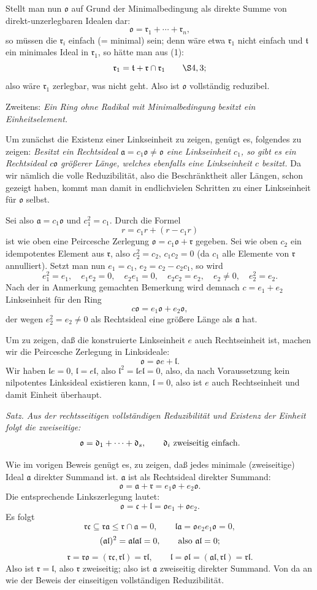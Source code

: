 \documentclass[11pt]{article}
\providecommand{\mo}{\mathfrak{o}}
\providecommand{\ma}{\mathfrak{a}}
\providecommand{\mc}{\mathfrak{c}}
\providecommand{\md}{\mathfrak{d}}
\providecommand{\ml}{\mathfrak{l}}
\providecommand{\mr}{\mathfrak{r}}
\providecommand{\mt}{\mathfrak{t}}
\begin{document}
Stellt man nun $\mo$ auf Grund der Minimalbedingung als direkte Summe von direkt-unzerlegbaren Idealen dar:
\[
        \mo=\mr_1+\cdots+\mr_n,
\]
so müssen die $\mr_i$ einfach (= minimal) sein; denn wäre etwa $\mr_1$ nicht einfach und $\mt$ ein minimales Ideal in $\mr_1$, so hätte man aus (1):
\[
        \mr_1=\mt+\mr\cap\mr_1 \qquad \hbox{\(\S 4,3\)};
\]
also wäre $\mr_1$ zerlegbar, was nicht geht. Also ist $\mo$ vollständig reduzibel.

Zweitens: \emph{Ein Ring ohne Radikal mit Minimalbedingung besitzt ein Einheitselement.}

Um zunächst die Existenz einer Linkseinheit zu zeigen, genügt es, folgendes zu zeigen: \emph{Besitzt ein Rechtsideal $\ma=c_1\mo\ne\mo$ eine Linkseinheit $c_1$, so gibt es ein Rechtsideal $c\mo$ größerer Länge, welches ebenfalls eine Linkseinheit $c$ besitzt.} Da wir nämlich die volle Reduzibilität, also die Beschränktheit aller Längen, schon gezeigt haben, kommt man damit in endlichvielen Schritten zu einer Linkseinheit für $\mo$ selbst.

Sei also $\ma=c_1\mo$ und $c_1^2=c_1$. Durch die Formel
\[
        r=c_1r+(r-c_1r)
\]
ist wie oben eine Peircesche Zerlegung $\mo=c_1\mo+\mr$ gegeben. Sei wie oben $c_2$ ein idempotentes Element aus $\mr$, also $c_2^2=c_2$, $c_1c_2=0$ (da $c_1$ alle Elemente von $\mr$ annulliert). Setzt man nun $e_1=c_1$, $e_2=c_2-c_2c_1$, so wird
\[
        e_1^2=e_1,
        \quad e_1e_2=0,
        \quad e_2e_1=0,
        \quad e_2c_2=e_2,
        \quad e_2\ne0,
        \quad e_2^2=e_2.
\]
Nach der in Anmerkung gemachten Bemerkung wird demnach $c=e_1+e_2$ Linkseinheit für den Ring
\[
        c\mo=e_1\mo+e_2\mo,
\]
der wegen $e_2^2=e_2\ne0$ als Rechtsideal eine größere Länge als $\ma$ hat.

Um zu zeigen, daß die konstruierte Linkseinheit $e$ auch Rechtseinheit ist, machen wir die Peircesche Zerlegung in Linksideale:
\[
        \mo=\mo e+\ml.
\]
Wir haben $\ml e=0$, $\ml=e\ml$, also $\ml^2=\ml e\ml=0$, also, da nach Voraussetzung kein nilpotentes Linksideal existieren kann, $\ml=0$, also ist $e$ auch Rechtseinheit und damit Einheit überhaupt.

\emph{Satz. Aus der rechtsseitigen vollständigen Reduzibilität und Existenz der Einheit folgt die zweiseitige:}
\[
        \mo=\md_1+\cdots+\md_s,
        \qquad \md_i \hbox{ zweiseitig einfach.}
\]

Wie im vorigen Beweis genügt es, zu zeigen, daß jedes minimale (zweiseitige) Ideal $\ma$ direkter Summand ist. $\ma$ ist als Rechtsideal direkter Summand:
\[
        \mo=\ma+\mr=e_1\mo+e_2\mo.
\]
Die entsprechende Linkszerlegung lautet:
\[
        \mo=\mc+\ml=\mo e_1+\mo e_2.
\]
Es folgt
\[
        \mr\mc\subseteq \mr\ma\leq \mr\cap\ma=0,
        \qquad
        \ml\ma=\mo e_2e_1\mo=0,
\]
\[
        (\ma\ml)^2=\ma\ml\ma\ml=0,
        \qquad \hbox{also } \ma\ml=0;
\]
\[
        \mr=\mr\mo=(\mr\mc,\mr\ml)=\mr\ml,
        \qquad
        \ml=\mo\ml=(\ma\ml,\mr\ml)=\mr\ml.
\]
Also ist $\mr=\ml$, also $\mr$ zweiseitig; also ist $\ma$ zweiseitig direkter Summand. Von da an wie der Beweis der einseitigen vollständigen Reduzibilität.
\end{document}
